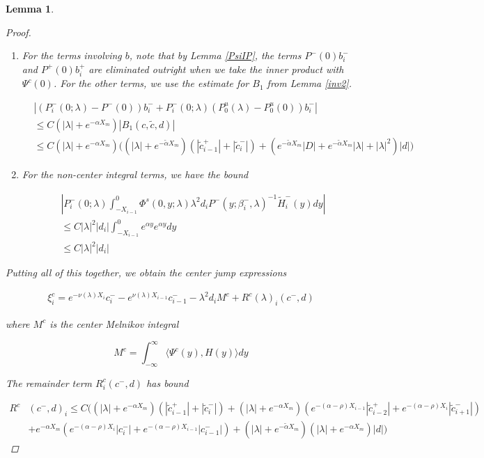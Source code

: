 \documentclass[12pt]{article}
\newtheorem{lemma}{Lemma}
\begin{document}
\begin{lemma}
\begin{proof}
\begin{enumerate}
\item For the terms involving $b$, note that by Lemma \ref{PsiIP}, the terms $P^-(0) b_i^-$ and $P^+(0)b_i^+$ are eliminated outright when we take the inner product with $\Psi^c(0)$. For the other terms, we use the estimate for $B_1$ from Lemma \ref{inv2}.

\begin{align*}
&|(P_i^-(0; \lambda) - P^-(0))b_i^- + P_i^-(0; \lambda)(P_0^u(\lambda) - P_0^u(0))b_i^-| \\
&\leq C(|\lambda| + e^{-\alpha X_m}) |B_1(c, \tilde{c}, d)| \\
&\leq C(|\lambda| + e^{-\alpha X_m}) \Big( 
(|\lambda| + e^{-\tilde{\alpha}X_m})( |\tilde{c}_{i-1}^+| + |\tilde{c}_i^-|)
+  ( e^{-\tilde{\alpha}X_m} |D| + e^{-\tilde{\alpha}X_m}|\lambda| + |\lambda|^2)|d| \Big)
\end{align*}

\item For the non-center integral terms, we have the bound

\begin{align*}
&\left| P_i^-(0; \lambda) 
\int_{-X_{i-1}}^0 \Phi^s(0, y; \lambda) \lambda^2 d_i P^-(y; \beta_i^-, \lambda)^{-1} \tilde{H}_i^-(y) dy \right| \\
&\leq C |\lambda|^2 |d_i| \int_{-X_{i-1}}^0 e^{\alpha y} e^{\alpha y} dy \\
&\leq C |\lambda|^2 |d_i|
\end{align*}

\end{enumerate}

Putting all of this together, we obtain the center jump expressions

\begin{align*}
\xi^c_i = e^{-\nu(\lambda) X_i} c_i^- - e^{\nu(\lambda) X_{i-1}} c_{i-1}^- - \lambda^2 d_i M^c + R^c(\lambda)_i(c^-, d)
\end{align*}

where $M^c$ is the center Melnikov integral

\[
M^c = \int_{-\infty}^\infty \langle \Psi^c(y), H(y) \rangle dy 
\]

The remainder term $R^c_i(c^-, d)$ has bound

\begin{align*}
R^c&(c^-, d)_i \leq C \Big(
(|\lambda| + e^{-\alpha X_m})(|\tilde{c}_{i-1}^+| + |\tilde{c}_{i}^-|) + (|\lambda| + e^{-\alpha X _m})( e^{-(\alpha - \rho) X_{i-1}} |\tilde{c}_{i-2}^+| + e^{-(\alpha - \rho) X_i} |\tilde{c}_{i+1}^-|)  \\
&+ e^{-\alpha X_m}( e^{-(\alpha - \rho) X_i}|c_i^-| + e^{-(\alpha - \rho) X_{i-1}}|c_{i-1}^-| )
+ (|\lambda| + e^{-\tilde{\alpha} X_m})(|\lambda| + e^{-\alpha X_m})|d|
\Big)
\end{align*}


\end{proof}
\end{lemma}
\end{document}

